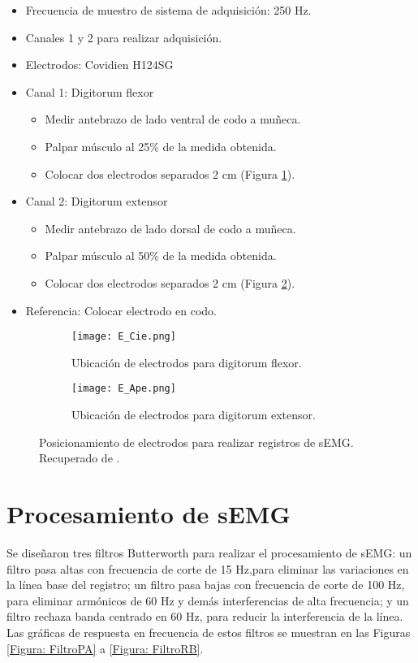 \begin{itemize}
	\item Frecuencia de muestro de sistema de adquisición: 250 Hz.
	\item Canales 1 y 2 para realizar adquisición.
	\item Electrodos: Covidien H124SG
	\item Canal 1: Digitorum flexor
	\begin{itemize}
		\item Medir antebrazo de lado ventral de codo a muñeca.
		\item Palpar músculo al 25\% de la medida obtenida.
		\item Colocar dos electrodos separados 2 cm (Figura \ref{Figura: E_Cie}).
	\end{itemize}
	\item Canal 2: Digitorum extensor
	\begin{itemize}
		\item Medir antebrazo de lado dorsal de codo a muñeca.
		\item Palpar músculo al 50\% de la medida obtenida.
		\item Colocar dos electrodos separados 2 cm (Figura \ref{Figura: E_Ape}).
	\end{itemize}
	\item Referencia: Colocar electrodo en codo.
\end{itemize}

\begin{figure}[htbp]
	\centering
	\begin{subfigure}[htbp]{0.3\textwidth}
		\texttt{[image: E\_Cie.png]}
		\caption{Ubicación de electrodos para digitorum flexor.}
		\label{Figura: E_Cie}
	\end{subfigure}
	\hfill
	\begin{subfigure}[htbp]{0.3\textwidth}
		\texttt{[image: E\_Ape.png]}
		\caption{Ubicación de electrodos para digitorum extensor.}
		\label{Figura: E_Ape}
	\end{subfigure}
	\caption{Posicionamiento de electrodos para realizar registros de sEMG. Recuperado de \cite{Cavalcanti-Garcia2009}.}
	\label{Figura: E_sEMG}
\end{figure}

\section{Procesamiento de sEMG}

Se diseñaron tres filtros Butterworth para realizar el procesamiento de sEMG: un filtro pasa altas con frecuencia de corte de 15 Hz,para eliminar las variaciones en la línea base del registro; un filtro pasa bajas con frecuencia de corte de 100 Hz, para eliminar armónicos de 60 Hz y demás interferencias de alta frecuencia; y un filtro rechaza banda centrado en 60 Hz, para reducir la interferencia de la línea. Las gráficas de respuesta en frecuencia de estos filtros se muestran en las Figuras \ref{Figura: FiltroPA} a \ref{Figura: FiltroRB}.

